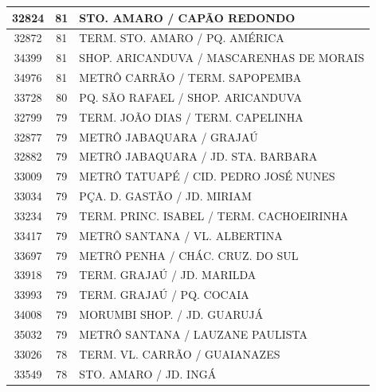 \documentclass[
	12pt,				%
	oneside,			%
	a4paper,			%
	english,			%
	brazil				%
	]{abntex2ppgsi}
\begin{document}
\begin{apendicesenv}
\begin{longtable}{c|c|p{7cm}}
    32824 & 81    & STO. AMARO / CAPÃO REDONDO \\
\hline

    32872 & 81    & TERM. STO. AMARO / PQ. AMÉRICA \\
\hline

    34399 & 81    & SHOP. ARICANDUVA / MASCARENHAS DE MORAIS \\
\hline

    34976 & 81    & METRÔ CARRÃO / TERM. SAPOPEMBA \\
\hline

    33728 & 80    & PQ. SÃO RAFAEL / SHOP. ARICANDUVA \\
\hline

    32799 & 79    & TERM. JOÃO DIAS / TERM. CAPELINHA \\
\hline

    32877 & 79    & METRÔ JABAQUARA / GRAJAÚ \\
\hline

    32882 & 79    & METRÔ JABAQUARA / JD. STA. BARBARA \\
\hline

    33009 & 79    & METRÔ TATUAPÉ / CID. PEDRO JOSÉ NUNES \\
\hline

    33034 & 79    & PÇA. D. GASTÃO / JD. MIRIAM \\
\hline

    33234 & 79    & TERM. PRINC. ISABEL / TERM. CACHOEIRINHA \\
\hline

    33417 & 79    & METRÔ SANTANA / VL. ALBERTINA \\
\hline

    33697 & 79    & METRÔ PENHA / CHÁC. CRUZ. DO SUL \\
\hline

    33918 & 79    & TERM. GRAJAÚ / JD. MARILDA \\
\hline

    33993 & 79    & TERM. GRAJAÚ / PQ. COCAIA \\
\hline

    34008 & 79    & MORUMBI SHOP. / JD. GUARUJÁ \\
\hline

    35032 & 79    & METRÔ SANTANA / LAUZANE PAULISTA \\
\hline

    33026 & 78    & TERM. VL. CARRÃO / GUAIANAZES \\
\hline

    33549 & 78    & STO. AMARO / JD. INGÁ \\
\hline


\end{longtable}
\end{apendicesenv}
\end{document}
